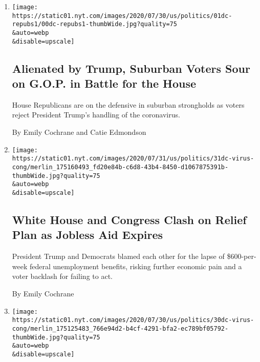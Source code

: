 \begin{enumerate}
\def\labelenumi{\arabic{enumi}.}
\item
  \href{/2020/08/01/us/politics/trump-suburban-voters-republicans-house.html}{}

  \texttt{[image: https://static01.nyt.com/images/2020/07/30/us/politics/01dc-repubs1/00dc-repubs1-thumbWide.jpg?quality=75\\\&auto=webp\\\&disable=upscale]}

  \hypertarget{alienated-by-trump-suburban-voters-sour-on-gop-in-battle-for-the-house}{%
  \subsection{Alienated by Trump, Suburban Voters Sour on G.O.P. in
  Battle for the
  House}\label{alienated-by-trump-suburban-voters-sour-on-gop-in-battle-for-the-house}}

  House Republicans are on the defensive in suburban strongholds as
  voters reject President Trump's handling of the coronavirus.

  By Emily Cochrane and Catie Edmondson
\item
  \href{/2020/07/31/us/politics/white-house-congress-relief-plan-jobless-aid.html}{}

  \texttt{[image: https://static01.nyt.com/images/2020/07/31/us/politics/31dc-virus-cong/merlin\_175160493\_fd20e84b-c6d8-43b4-8450-d1067875391b-thumbWide.jpg?quality=75\\\&auto=webp\\\&disable=upscale]}

  \hypertarget{white-house-and-congress-clash-on-relief-plan-as-jobless-aid-expires}{%
  \subsection{White House and Congress Clash on Relief Plan as Jobless
  Aid
  Expires}\label{white-house-and-congress-clash-on-relief-plan-as-jobless-aid-expires}}

  President Trump and Democrats blamed each other for the lapse of
  \$600-per-week federal unemployment benefits, risking further economic
  pain and a voter backlash for failing to act.

  By Emily Cochrane
\item
  \href{/2020/07/30/us/politics/senate-virus-aid.html}{}

  \texttt{[image: https://static01.nyt.com/images/2020/07/30/us/politics/30dc-virus-cong/merlin\_175125483\_766e94d2-b4cf-4291-bfa2-ec789bf05792-thumbWide.jpg?quality=75\\\&auto=webp\\\&disable=upscale]}


\end{enumerate}
